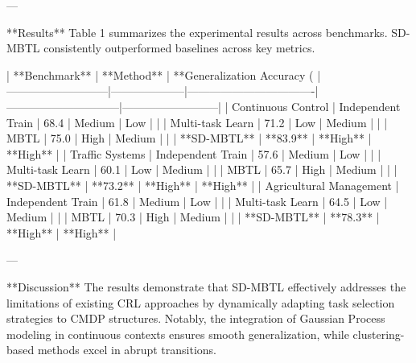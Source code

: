 ---

**Results**  
Table 1 summarizes the experimental results across benchmarks. SD-MBTL consistently outperformed baselines across key metrics.  

| **Benchmark**            | **Method**         | **Generalization Accuracy (%
|---------------------------|--------------------|----------------------------------|------------------------------|--------------------------|  
| Continuous Control        | Independent Train | 68.4                            | Medium                       | Low                      |  
|                           | Multi-task Learn  | 71.2                            | Low                          | Medium                   |  
|                           | MBTL              | 75.0                            | High                         | Medium                   |  
|                           | **SD-MBTL**       | **83.9**                        | **High**                     | **High**                 |  
| Traffic Systems           | Independent Train | 57.6                            | Medium                       | Low                      |  
|                           | Multi-task Learn  | 60.1                            | Low                          | Medium                   |  
|                           | MBTL              | 65.7                            | High                         | Medium                   |  
|                           | **SD-MBTL**       | **73.2**                        | **High**                     | **High**                 |  
| Agricultural Management   | Independent Train | 61.8                            | Medium                       | Low                      |  
|                           | Multi-task Learn  | 64.5                            | Low                          | Medium                   |  
|                           | MBTL              | 70.3                            | High                         | Medium                   |  
|                           | **SD-MBTL**       | **78.3**                        | **High**                     | **High**                 |  

---

**Discussion**  
The results demonstrate that SD-MBTL effectively addresses the limitations of existing CRL approaches by dynamically adapting task selection strategies to CMDP structures. Notably, the integration of Gaussian Process modeling in continuous contexts ensures smooth generalization, while clustering-based methods excel in abrupt transitions.  

